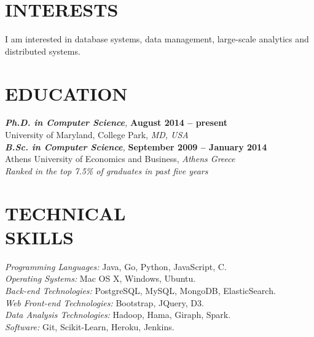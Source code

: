 \documentclass[margin, 10pt]{res} %
\begin{document}
\begin{resume}


\section{INTERESTS}

I am interested in database systems, data management, large-scale analytics and distributed systems.


\section{EDUCATION}

{\sl \textbf{Ph.D. in Computer Science},}  \hfill \textbf{August 2014 -- present} \\
University of Maryland, College Park,  \textit{MD, USA}\\

{\sl \textbf{B.Sc. in Computer Science},}  \hfill \textbf{September 2009 -- January 2014} \\
Athens University of Economics and Business, \textit{Athens Greece}\\
\textit{Ranked in the top 7.5\% of graduates in past five years}\\


\section{TECHNICAL \\ SKILLS}

{\sl Programming Languages:} Java, Go, Python, JavaScript, C. \\
{\sl Operating Systems:} Mac OS X, Windows, Ubuntu.\\
{\sl Back-end Technologies:} PostgreSQL, MySQL, MongoDB, ElasticSearch. \\
{\sl Web Front-end Technologies:} Bootstrap, JQuery, D3. \\
{\sl Data Analysis Technologies:} Hadoop, Hama, Giraph, Spark.\\
{\sl Software:} Git, Scikit-Learn, Heroku, Jenkins. \\





\end{resume}
\end{document}
